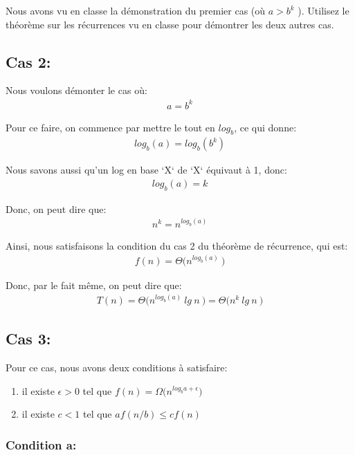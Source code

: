 \documentclass[12pt]{article}
\begin{document}
Nous avons vu en classe la démonstration du premier cas (où  \(a > b^k\)
).
Utilisez le théorème sur les récurrences vu en classe pour démontrer les
deux autres cas.


\subsection*{Cas 2:}

Nous voulons démonter le cas où:
\begin{align*}
	a = b^k
\end{align*}

\noindent Pour ce faire, on commence par mettre le tout en 
\(  log_b\), ce qui donne: 
\begin{align*}
	 log_b(a) = log_b(b^k)
\end{align*}

Nous savons aussi qu'un log en base `X` de `X` équivaut à 1, donc:
\begin{align*}
	 log_b(a) = k
\end{align*}

Donc, on peut dire que:
\begin{align*}
	 n^k = n^{log_b(a)}
\end{align*}

Ainsi, nous satisfaisons la condition du cas 2 du théorème de récurrence, qui est:
\begin{align*}
	f(n) = \Theta\big(n^{log_b(a)} \: \big)
\end{align*}

Donc, par le fait même, on peut dire que:
\begin{align*}
	T(n) = \Theta\big(n^{log_b(a)} \: lg \: n \: \big) = \Theta\big(n^k \: lg \: n \: \big)
\end{align*}


\subsection*{Cas 3:}

Pour ce cas, nous avons deux conditions à satisfaire:
    \begin{enumerate}[label=(\alph*)]
      \item  il existe \( \epsilon > 0 \) tel que \( f(n) = \Omega\big(n^{log_ba+\epsilon}  \big) \)
      \item il existe \( c < 1 \) tel que \(af(n/b) \leq cf(n) \)
    \end{enumerate}


\subsubsection*{Condition a:}
\end{document}
